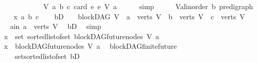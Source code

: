 \begin{isabellebody}
\ \ \ \ \ \ \ \ \ \ \ \ {\isasymlambda}{\isacharparenleft}{\kern0pt}V{\isacharcomma}{\kern0pt}\ a{\isacharcomma}{\kern0pt}\ b{\isacharcomma}{\kern0pt}\ c{\isacharparenright}{\kern0pt}{\isachardot}{\kern0pt}\ card\ {\isacharbraceleft}{\kern0pt}e{\isachardot}{\kern0pt}\ e\ {\isasymrightarrow}\isactrlsup {\isacharasterisk}{\kern0pt}\isactrlbsub V\isactrlesub \ a{\isacharbraceright}{\kern0pt}{\isacharbrackright}{\kern0pt}{\isachardoublequoteclose}\isanewline
\ \ \ \ \isamarkupfalse%
\ simp\isanewline
{}\isamarkupfalse%
\ \isanewline
\ \ \isamarkupfalse%
\ V{\isacharcolon}{\kern0pt}{\isacharcolon}{\kern0pt}{\isachardoublequoteopen}{\isacharparenleft}{\kern0pt}{\isacharprime}{\kern0pt}a{\isacharcolon}{\kern0pt}{\isacharcolon}{\kern0pt}linorder{\isacharcomma}{\kern0pt}\ {\isacharprime}{\kern0pt}b{\isacharparenright}{\kern0pt}\ pre{\isacharunderscore}{\kern0pt}digraph{\isachardoublequoteclose}\ \isanewline
\ \ \isamarkupfalse%
\ x\ a\ b\ c\isanewline
\ \ \isamarkupfalse%
\ bD{\isacharcolon}{\kern0pt}\ {\isachardoublequoteopen}\ {\isasymnot}\ {\isacharparenleft}{\kern0pt}{\isasymnot}\ blockDAG\ V\ {\isasymor}\ a\ {\isasymnotin}\ verts\ V\ {\isasymor}\ b\ {\isasymnotin}\ verts\ V\ {\isasymor}\ c\ {\isasymnotin}\ verts\ V{\isacharparenright}{\kern0pt}{\isachardoublequoteclose}\isanewline
\ \ \isamarkupfalse%
\ \isamarkupfalse%
\ a{\isacharunderscore}{\kern0pt}in{\isacharcolon}{\kern0pt}\ {\isachardoublequoteopen}a\ {\isasymin}\ verts\ V{\isachardoublequoteclose}\ \isamarkupfalse%
\ bD\ \isamarkupfalse%
\ simp\isanewline
\ \ \isamarkupfalse%
\ {\isachardoublequoteopen}x\ {\isasymin}\ set\ {\isacharparenleft}{\kern0pt}sorted{\isacharunderscore}{\kern0pt}list{\isacharunderscore}{\kern0pt}of{\isacharunderscore}{\kern0pt}set\ {\isacharparenleft}{\kern0pt}blockDAG{\isachardot}{\kern0pt}future{\isacharunderscore}{\kern0pt}nodes\ V\ a{\isacharparenright}{\kern0pt}{\isacharparenright}{\kern0pt}{\isachardoublequoteclose}\isanewline
\ \ \isamarkupfalse%
\ \isamarkupfalse%
\ {\isachardoublequoteopen}x\ {\isasymin}\ blockDAG{\isachardot}{\kern0pt}future{\isacharunderscore}{\kern0pt}nodes\ V\ a{\isachardoublequoteclose}\ \isamarkupfalse%
\ blockDAG{\isachardot}{\kern0pt}finite{\isacharunderscore}{\kern0pt}future\isanewline
\ \ \ \ set{\isacharunderscore}{\kern0pt}sorted{\isacharunderscore}{\kern0pt}list{\isacharunderscore}{\kern0pt}of{\isacharunderscore}{\kern0pt}set\ bD\isanewline

\end{isabellebody}
